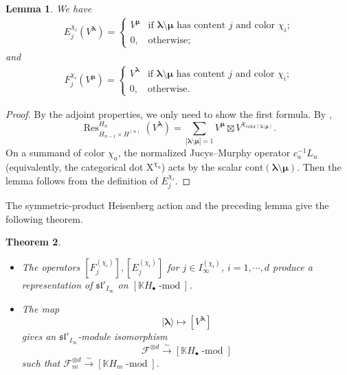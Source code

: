 \documentclass[12pt]{amsart}
\numberwithin{itemcounter}{subsection}
\theoremstyle{plain}
\newtheorem{theorem}{Theorem}[section]
\newtheorem{lemma}[theorem]{Lemma}
\theoremstyle{definition}
\theoremstyle{remark}
\numberwithin{equation}{section}
\def\bbK{\mathbb{K}}
\def\fraks{\mathfrak{s}}
\def\frakl{\mathfrak{l}}
\def\calF{\mathcal{F}}
\def\frakl{\mathfrak{l}}
\def\simto{\overset{\sim}\to}
\def\Res{\operatorname{Res}\nolimits}
\def\mod{\operatorname{-mod}\nolimits}
\newcommand*{\tuple}[1]
{\boldsymbol{#1}}
\begin{document}
									\begin{lemma}
										We have
										\begin{align*}E^{\chi_i}_j(V^{\tuple \lambda})=\begin{cases}
												V^{\tuple\mu } & \text{if $\tuple\lambda \setminus \tuple \mu $ has content $j$ and color $\chi_i$;}\\
												0,&\text{otherwise;}
											\end{cases}
										\end{align*} and
										\begin{align*}
											F^{\chi_i}_j(V^{\tuple \mu})=\begin{cases}
												V^{\tuple\lambda } & \text{if $\tuple\lambda \setminus \tuple \mu $ has content $j$ and color $\chi_i$;}\\
												0,&\text{otherwise.}
											\end{cases}
									\end{align*}\end{lemma}
									\begin{proof}
										By the adjoint properties, we only need to show the first formula.
										By \cite{MS16}, $$\Res^{ H _n}_{ H _{n-1}\times H ^{(n)}}(V^{\tuple\lambda})=\sum_{|\tuple\lambda\setminus\tuple\mu|=1}V^{\tuple\mu}\boxtimes V^{\chi_{{\mathrm{color}(\tuple\lambda\setminus\tuple\mu)}}}.$$ On a summand of color $\chi_a$, the normalized Jucys--Murphy operator $c_a^{-1}L_n$ (equivalently, the categorical dot $\mathrm{X}^{\chi_a}$) acts by the scalar $\mathrm{cont}(\tuple\lambda\setminus\tuple\mu)$. Then the lemma follows from the definition of $E^{\chi_i}_j.$
									\end{proof}

                                    The symmetric-product Heisenberg action and the preceding lemma give the following theorem.

									\begin{theorem}
										\begin{itemize}[leftmargin=8mm]
											\item[$\mathrm{(a)}$]
											The operators $[F_j^{(\chi_i)}],[E_j^{(\chi_i)}] $ for $j\in I_\infty^{(\chi_i)}$, $i=1,\cdots,d$ produce a representation of $\fraks\frakl'_{I_\infty}$ on $[\bbK H _\bullet\mod]$.
											\item[$\mathrm{(b)}$] The map
											$$|\tuple\lambda\rangle
											\mapsto [V^{\tuple\lambda}]$$ gives an
											$\fraks\frakl'_{I_\infty}$-module isomorphism $$
											\calF^{\otimes d}\simto [\bbK H _\bullet\mod]$$
											such that $\calF^{\otimes d}_m\simto [\bbK H _m\mod].$
										\end{itemize}
									\end{theorem}
\end{document}
